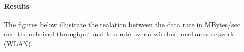 \documentclass[aps,letterpaper,10pt]{revtex4}
\begin{document}
            \paragraph{Results}
                The figures below illustrate the realation between the data rate in MBytes/sec and the acheived throughput and loss rate over a wireless local area network (WLAN).
                \begin{figure}[htp]
                    \begin{center}
                \end{center}
            \end{figure}
            
            \vspace{3mm}
            
\end{document}
